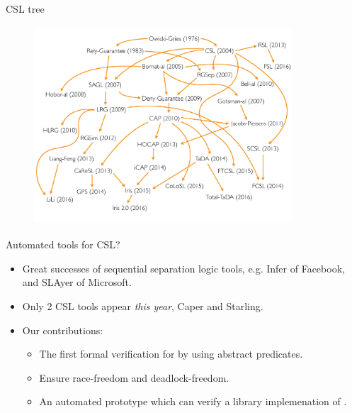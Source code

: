 \documentclass[11pt]{beamer}
\begin{document}
\begin{frame}{CSL tree}
  \begin{figure}
  	\includegraphics[width=26em,height=20em]{./images/CSL-Family-Tree.pdf}
  \end{figure}
\end{frame}


\begin{frame}{Automated tools for CSL?}
  \begin{itemize}
  \item Great successes of sequential separation logic tools, e.g. Infer of
    Facebook, and SLAyer of Microsoft. 
  \item Only 2 CSL tools appear \textit{this year}, Caper and Starling.
    \pause
  \item Our contributions:
    \begin{itemize}
    \item The first formal verification for {\CDL} by using abstract predicates.
    \item Ensure race-freedom and deadlock-freedom.
    \item An automated prototype which can verify a library implemenation of {\CDL}.
    \end{itemize}
  \end{itemize}
 \end{frame}
\end{document}
